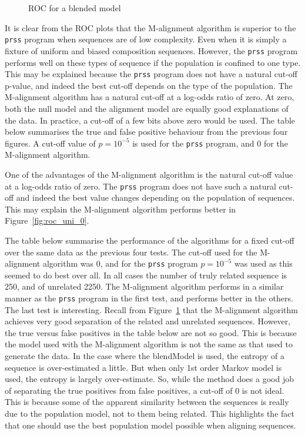 \documentclass[letterpaper,11pt,oneside]{article}
\def\plotwidth{0.7\columnwidth}
\begin{document}

\begin{figure}
\centering
\epsfig{file=roc_blend.eps, width=\plotwidth}
\caption{\label{fig:roc_blend}ROC for a blended model}
\end{figure}


It is clear from the ROC plots that the M-alignment algorithm is superior to
the \verb!prss! program when sequences are of low complexity.  Even when it is
simply a fixture of uniform and biased composition sequences.  However, the
\verb!prss! program performs well on these types of sequence if the population
is confined to one type.  This may be explained because the \verb!prss!
program does not have a natural cut-off p-value, and indeed the best cut-off
depends on the type of the population.  The M-alignment algorithm has a
natural cut-off at a log-odds ratio of zero.  At zero, both the null model and
the alignment model are equally good explanations of the data.  In practice, a
cut-off of a few bits above zero would be used.  The table below summarises the
true and false positive behaviour from the previous four figures.  A cut-off
value of $p=10^{-5}$ is used for the \verb!prss! program, and 0 for the
M-alignment algorithm.

One of the advantages of the M-alignment algorithm is the natural cut-off
value at a log-odds ratio of zero.  The \verb!prss! program does not have such
a natural cut-off and indeed the best value changes depending on the
population of sequences.  This may explain the M-alignment algorithm performs
better in Figure~\ref{fig:roc_uni_0}.  

The table below summarise the performance of the algorithms for a fixed
cut-off over the same data as the previous four tests.  The cut-off used for
the M-alignment algorithm was 0, and for the \verb!prss! program $p=10^{-5}$
was used as this seemed to do best over all.  In all cases the number of
truly related sequence is 250, and of unrelated 2250.  The M-alignment
algorithm performs in a similar manner as the \verb!prss! program in the first
test, and performs better in the others.  The last test is interesting.
Recall from Figure~\ref{fig:roc_blend} that the M-alignment algorithm achieves
very good separation of the related and unrelated sequences.  However, the
true versus false positives in the table below are not so good.  This is
because the model used with the M-alignment algorithm is not the same as that
used to generate the data.  In the case where the blendModel is used, the
entropy of a sequence is over-estimated a little.  But when only 1st order
Markov model is used, the entropy is largely over-estimate.  So, while the
method does a good job of separating the true positives from false positives,
a cut-off of 0 is not ideal.  This is because some of the apparent similarity
between the sequences is really due to the population model, not to them being
related.  This highlights the fact that one should use the best population
model possible when aligning sequences.
\end{document}

